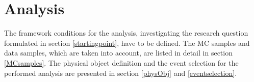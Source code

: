 \chapter{Analysis}\label{analysis}
The framework conditions for the analysis, investigating the research question formulated in section \ref{startingpoint}, have to be defined. 
The MC samples and data samples, which are taken into account, are listed in detail in section \ref{MCsamples}. The physical object definition and the event selection for the performed analysis are presented in section \ref{physObj} and \ref{eventselection}.  
